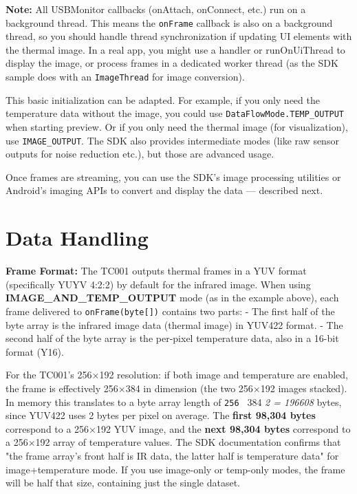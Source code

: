 {\begin{itemize}
\end{itemize}
\textbf{Note:} All USBMonitor callbacks (onAttach, onConnect, etc.) run on a
background
thread\cite{ref22}.
This means the \texttt{onFrame} callback is also on a background thread, so you
should handle thread synchronization if updating UI elements with the
thermal image. In a real app, you might use a handler or runOnUiThread
to display the image, or process frames in a dedicated worker thread (as
the SDK sample does with an \texttt{ImageThread} for image conversion).

This basic initialization can be adapted. For example, if you only need
the temperature data without the image, you could use
\texttt{DataFlowMode.TEMP_OUTPUT} when starting preview. Or if you only need
the thermal image (for visualization), use \texttt{IMAGE_OUTPUT}. The SDK also
provides intermediate modes (like raw sensor outputs for noise reduction
etc.), but those are advanced usage.

Once frames are streaming, you can use the SDK's image processing
utilities or Android's imaging APIs to convert and display the data ---
described next.

\section{Data Handling}

\textbf{Frame Format:} The TC001 outputs thermal frames in a YUV format
(specifically YUYV 4:2:2) by default for the infrared
image\cite{ref23}.
When using \textbf{IMAGE_AND_TEMP_OUTPUT} mode (as in the example above),
each frame delivered to \texttt{onFrame(byte[])} contains two parts: - The
first half of the byte array is the infrared image data (thermal image)
in YUV422 format. - The second half of the byte array is the per-pixel
temperature data, also in a 16-bit format (Y16).

For the TC001's 256×192 resolution: if both image and temperature are
enabled, the frame is effectively 256×384 in dimension (the two 256×192
images stacked). In memory this translates to a byte array length of
\texttt{256 } 384 \textit{ 2 = 196608} bytes, since YUV422 uses 2 bytes per pixel on
average. The \textbf{first 98,304 bytes} correspond to a 256×192 YUV image,
and the \textbf{next 98,304 bytes} correspond to a 256×192 array of
temperature
values\cite{ref24}\cite{ref25}.
The SDK documentation confirms that "the frame array's front half is IR
data, the latter half is temperature data" for image+temperature
mode\cite{ref26}\cite{ref25}.
If you use image-only or temp-only modes, the frame will be half that
size, containing just the single dataset.

}
